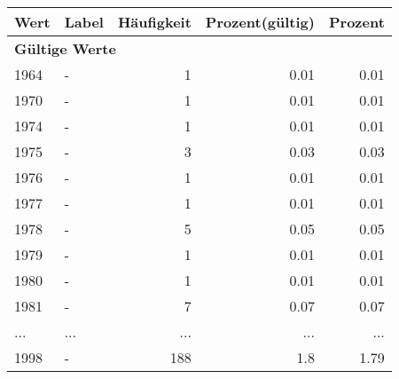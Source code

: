      \begin{longtable}{lXrrr}
     \toprule
     \textbf{Wert} & \textbf{Label} & \textbf{Häufigkeit} & \textbf{Prozent(gültig)} & \textbf{Prozent} \\
     \endhead
     \midrule
     \multicolumn{5}{l}{\textbf{Gültige Werte}}\\
        1964 & \multicolumn{1}{X}{-} & %
          \num{1} &
          \num[round-mode=places,round-precision=2]{0,01} &
          \num[round-mode=places,round-precision=2]{0,01} \\
        1970 & \multicolumn{1}{X}{-} & %
          \num{1} &
          \num[round-mode=places,round-precision=2]{0,01} &
          \num[round-mode=places,round-precision=2]{0,01} \\
        1974 & \multicolumn{1}{X}{-} & %
          \num{1} &
          \num[round-mode=places,round-precision=2]{0,01} &
          \num[round-mode=places,round-precision=2]{0,01} \\
        1975 & \multicolumn{1}{X}{-} & %
          \num{3} &
          \num[round-mode=places,round-precision=2]{0,03} &
          \num[round-mode=places,round-precision=2]{0,03} \\
        1976 & \multicolumn{1}{X}{-} & %
          \num{1} &
          \num[round-mode=places,round-precision=2]{0,01} &
          \num[round-mode=places,round-precision=2]{0,01} \\
        1977 & \multicolumn{1}{X}{-} & %
          \num{1} &
          \num[round-mode=places,round-precision=2]{0,01} &
          \num[round-mode=places,round-precision=2]{0,01} \\
        1978 & \multicolumn{1}{X}{-} & %
          \num{5} &
          \num[round-mode=places,round-precision=2]{0,05} &
          \num[round-mode=places,round-precision=2]{0,05} \\
        1979 & \multicolumn{1}{X}{-} & %
          \num{1} &
          \num[round-mode=places,round-precision=2]{0,01} &
          \num[round-mode=places,round-precision=2]{0,01} \\
        1980 & \multicolumn{1}{X}{-} & %
          \num{1} &
          \num[round-mode=places,round-precision=2]{0,01} &
          \num[round-mode=places,round-precision=2]{0,01} \\
        1981 & \multicolumn{1}{X}{-} & %
          \num{7} &
          \num[round-mode=places,round-precision=2]{0,07} &
          \num[round-mode=places,round-precision=2]{0,07} \\
       ... & ... & ... & ... & ... \\
        1998 & \multicolumn{1}{X}{-} & %
          \num{188} &
          \num[round-mode=places,round-precision=2]{1,8} &
          \num[round-mode=places,round-precision=2]{1,79} \\


\end{longtable}
